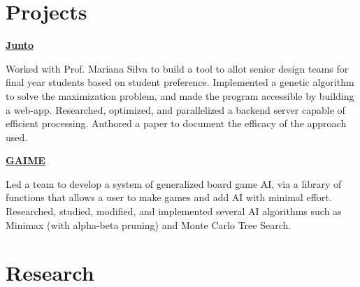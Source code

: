 \documentclass[10pt, oneside, openany]{article} %
\begin{document}
\begin{paracol}{2}
\begin{supertabular}{ll}
\end{supertabular}



\section{Projects}

{\raggedright\textbf{\href{https://peer.asee.org/34876}{Junto}}\\}

Worked with Prof. Mariana Silva to build a tool to allot senior design teams for final year students based on student preference. Implemented a genetic algorithm to solve the maximization problem, and made the program accessible by building a web-app. Researched, optimized, and parallelized a backend server capable of efficient processing. Authored a paper to document the efficacy of the approach used.\\

{\raggedright\textbf{\href{https://github.com/nimberledge/gAIme}{{GAIME}}\\}}
Led a team to develop a system of generalized board game AI, via a library of functions that allows a user to make games and add AI with minimal effort. Researched, studied, modified, and implemented several AI algorithms such as Minimax (with alpha-beta pruning) and Monte Carlo Tree Search.


\section{Research}






\end{paracol}
\end{document}
